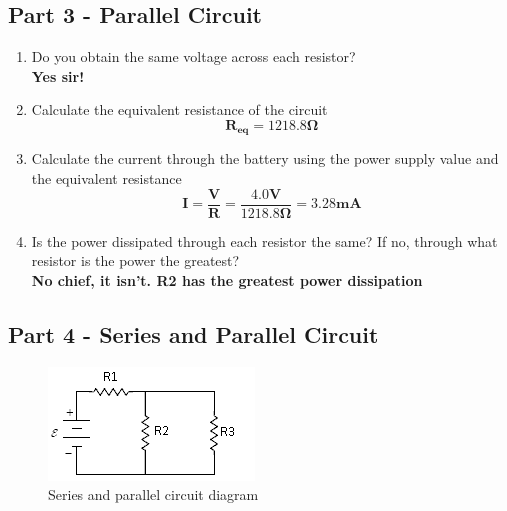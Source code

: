 \documentclass[titlepage]{article}
\begin{document}
\subsection*{Part 3 - Parallel Circuit} 
    \begin{enumerate} 
        \item Do you obtain the same voltage across each resistor? \\
            \textbf{Yes sir!} 

        \item Calculate the equivalent resistance of the circuit \\
            $$\mathbf{R_{eq} = 1218.8 \Omega}$$
        \item Calculate the current through the battery using the power supply value and the equivalent resistance \\ 
            $$ \mathbf{I=\frac{V}{R} = \frac{4.0V}{1218.8\Omega} =3.28 mA }$$ 
        \item Is the power dissipated through each resistor the same? If no, through what resistor is the power the greatest?\\
            \textbf{No chief, it isn't. R2 has the greatest power dissipation} 
    \end{enumerate}

\subsection*{Part 4 - Series and Parallel Circuit} 
    \FloatBarrier
    \begin{figure}[hbt!]
        \centering
        \caption{Series and parallel circuit diagram}
        \includegraphics[scale = 1.2]{images/questions/circuit.png}
    \end{figure}
    \FloatBarrier
\end{document}
